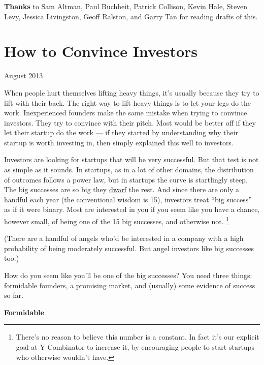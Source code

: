 \documentclass[12pt]{book}
\begin{document}
\textbf{Thanks} to Sam Altman, Paul Buchheit, Patrick Collison, Kevin
Hale, Steven Levy, Jessica Livingston, Geoff Ralston, and Garry Tan for
reading drafts of this.
\chapter{How to Convince Investors}

August 2013

When people hurt themselves lifting heavy things, it's usually because
they try to lift with their back. The right way to lift heavy things is
to let your legs do the work. Inexperienced founders make the same
mistake when trying to convince investors. They try to convince with
their pitch. Most would be better off if they let their startup do the
work --- if they started by understanding why their startup is worth
investing in, then simply explained this well to investors.

Investors are looking for startups that will be very successful. But
that test is not as simple as it sounds. In startups, as in a lot of
other domains, the distribution of outcomes follows a power law, but in
startups the curve is startlingly steep. The big successes are so big
they \href{swan.html}{dwarf} the rest. And since there are only a
handful each year (the conventional wisdom is 15), investors treat ``big
success'' as if it were binary. Most are interested in you if you seem
like you have a chance, however small, of being one of the 15 big
successes, and otherwise not. \footnote{There's no reason to believe this number is a constant. In fact
it's our explicit goal at Y Combinator to increase it, by encouraging
people to start startups who otherwise wouldn't have.}

(There are a handful of angels who'd be interested in a company with a
high probability of being moderately successful. But angel investors
like big successes too.)

How do you seem like you'll be one of the big successes? You need three
things: formidable founders, a promising market, and (usually) some
evidence of success so far.

\textbf{Formidable}
\end{document}
